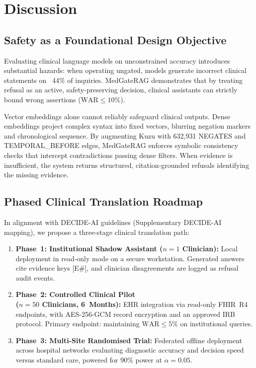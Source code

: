 \documentclass[preprint,12pt,a4paper]{elsarticle}
\begin{document}
\section{Discussion}
\label{sec:discussion}

\subsection{Safety as a Foundational Design Objective}
\label{sec:safety_design}

Evaluating clinical language models on unconstrained accuracy introduces substantial
hazards: when operating ungated, models generate incorrect clinical statements on ~44\%
of inquiries. MedGateRAG demonstrates that by treating refusal as an active,
safety-preserving decision, clinical assistants can strictly bound wrong assertions
($\text{WAR} \leq 10\%$).

Vector embeddings alone cannot reliably safeguard clinical outputs. Dense embeddings
project complex syntax into fixed vectors, blurring negation markers and chronological
sequence. By augmenting Kuzu with 632,931 \textsc{NEGATES} and \textsc{TEMPORAL\_BEFORE}
edges, MedGateRAG enforces symbolic consistency checks that intercept contradictions
passing dense filters. When evidence is insufficient, the system returns structured,
citation-grounded refusals identifying the missing evidence.

\subsection{Phased Clinical Translation Roadmap}
\label{sec:roadmap}

In alignment with DECIDE-AI guidelines \citep{vasey2022decide} (Supplementary DECIDE-AI
mapping), we propose a three-stage clinical translation path:
\begin{enumerate}
  \item \textbf{Phase~1: Institutional Shadow Assistant ($n=1$ Clinician):} Local
        deployment in read-only mode on a secure workstation. Generated answers cite
        evidence keys [E\#], and clinician disagreements are logged as refusal audit events.
  \item \textbf{Phase~2: Controlled Clinical Pilot}\\
        \textbf{($n=50$ Clinicians, 6~Months):}
        EHR integration via read-only FHIR~R4 endpoints, with AES-256-GCM record
        encryption and an approved IRB protocol. Primary endpoint: maintaining
        $\text{WAR} \leq 5\%$ on institutional queries.
  \item \textbf{Phase~3: Multi-Site Randomised Trial:} Federated offline deployment
        across hospital networks evaluating diagnostic accuracy and decision speed
        versus standard care, powered for 90\% power at $\alpha=0.05$.
\end{enumerate}
\end{document}

